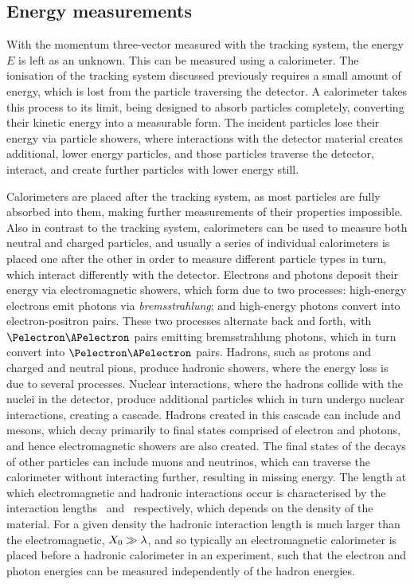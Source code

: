\subsection{Energy measurements}

With the momentum three-vector measured with the tracking system, the energy 
$E$ is left as an unknown.
This can be measured using a calorimeter.
The ionisation of the tracking system discussed previously requires a small 
amount of energy, which is lost from the particle traversing the detector.
A calorimeter takes this process to its limit, being designed to absorb 
particles completely, converting their kinetic energy into a measurable form.
The incident particles lose their energy via particle showers, where 
interactions with the detector material creates additional, lower energy 
particles, and those particles traverse the detector, interact, and create 
further particles with lower energy still.

Calorimeters are placed after the tracking system, as most particles are fully 
absorbed into them, making further measurements of their properties impossible.
Also in contrast to the tracking system, calorimeters can be used to measure 
both neutral and charged particles, and usually a series of individual 
calorimeters is placed one after the other in order to measure different 
particle types in turn, which interact differently with the detector.
Electrons and photons deposit their energy via electromagnetic showers, which 
form due to two processes: high-energy electrons emit photons via 
\emph{bremsstrahlung}; and high-energy photons convert into electron-positron 
pairs.
These two processes alternate back and forth, with $\Pelectron\APelectron$ 
pairs emitting bremsstrahlung photons, which in turn convert into 
$\Pelectron\APelectron$ pairs.
Hadrons, such as protons and charged and neutral pions, produce hadronic 
showers, where the energy loss is due to several processes.
Nuclear interactions, where the hadrons collide with the nuclei in the 
detector, produce additional particles which in turn undergo nuclear 
interactions, creating a cascade.
Hadrons created in this cascade can include \Ppizero and \Peta mesons, which 
decay primarily to final states comprised of electron and photons, and hence 
electromagnetic showers are also created.
The final states of the decays of other particles can include muons and 
neutrinos, which can traverse the calorimeter without interacting further, 
resulting in missing energy.
The length at which electromagnetic and hadronic interactions occur is 
characterised by the interaction lengths \radlen\ and \hadlen\ respectively, 
which depends on the density of the material.
For a given density the hadronic interaction length is much larger than the 
electromagnetic, $X_{0} \gg \lambda$, and so typically an electromagnetic 
calorimeter is placed before a hadronic calorimeter in an experiment, such that 
the electron and photon energies can be measured independently of the hadron 
energies.

